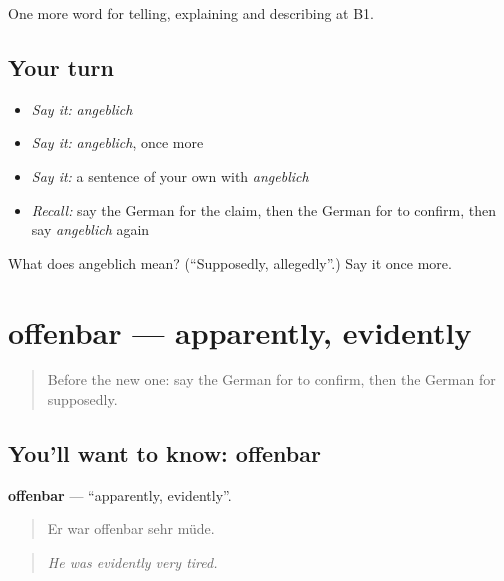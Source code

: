 \begin{grammarlens}[title={What you've built}]
One more word for telling, explaining and describing at B1.
\end{grammarlens}

\subsection*{Your turn}
\begin{itemize}
\raggedright
  \item \emph{Say it:} \emph{angeblich}
  \item \emph{Say it:} \emph{angeblich}, once more
  \item \emph{Say it:} a sentence of your own with \emph{angeblich}
  \item \emph{Recall:} say the German for the claim, then the German for to confirm, then say \emph{angeblich} again
\end{itemize}

\begin{tcolorbox}[breakable,colback=teal!4,colframe=teal!35!black,title={Before you move on}]
What does angeblich mean? (\textquotedblleft{}Supposedly, allegedly\textquotedblright{}.) Say it once more.
\end{tcolorbox}
\section[offenbar]{offenbar — apparently, evidently}

\label{lesson:GE-C275-offenbar}



\begin{quote}
Before the new one: say the German for to confirm, then the German for supposedly.
\end{quote}

\subsection*{You'll want to know: offenbar}
\textbf{offenbar} — \textquotedblleft{}apparently, evidently\textquotedblright{}.

\begin{quote}
Er war offenbar sehr müde.
\end{quote}

\begin{quote}
\emph{He was evidently very tired.}
\end{quote}

